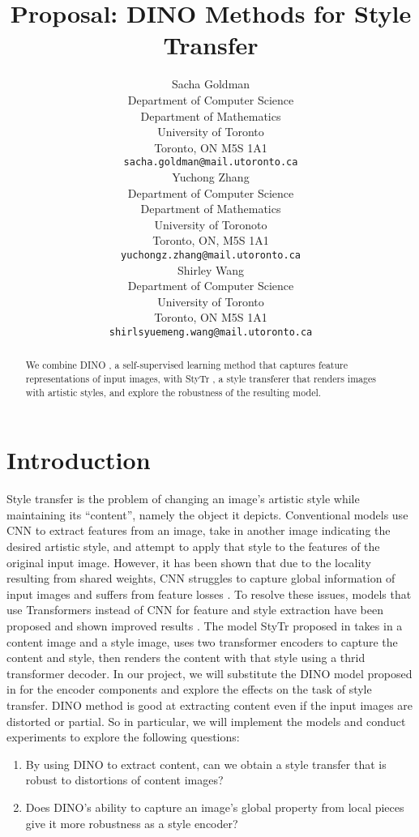 \documentclass{article}
\title{Proposal: DINO Methods for Style Transfer}
\author{
  Sacha Goldman \\
  Department of Computer Science\\ 
  Department of Mathematics\\
  University of Toronto\\
  Toronto, ON M5S 1A1 \\
  \texttt{sacha.goldman@mail.utoronto.ca} \\
  \And
  Yuchong Zhang \\
  Department of Computer Science \\
  Department of Mathematics \\
  University of Toronoto \\
  Toronto, ON, M5S 1A1 \\
  \texttt{yuchongz.zhang@mail.utoronto.ca} \\
  \And
  Shirley Wang \\
  Department of Computer Science \\
  University of Toronto \\
  Toronto, ON M5S 1A1 \\
  \texttt{shirlsyuemeng.wang@mail.utoronto.ca} \\
}
\begin{document}
\maketitle

\begin{abstract}
We combine DINO \cite{DINO}, a self-supervised learning method that captures feature representations of input images, with StyTr \cite{ImageStyleTransformer}, a style transferer that renders images with artistic styles, and explore the robustness of the resulting model.
\end{abstract}

\section{Introduction}
Style transfer is the problem of changing an image's artistic style while maintaining its ``content'', namely the object it depicts. Conventional models use CNN to extract features from an image, take in another image indicating the desired artistic style, and attempt to apply that style to the features of the original input image. However, it has been shown that due to the locality resulting from shared weights, CNN struggles to capture global information of input images and suffers from feature losses \cite{ImageStyleTransformer}. To resolve these issues, models that use Transformers instead of CNN for feature and style extraction have been proposed and shown improved results \cite{ImageStyleTransformer}. The model StyTr proposed in \cite{ImageStyleTransformer} takes in a content image and a style image, uses two transformer encoders to capture the content and style, then renders the content with that style using a thrid transformer decoder. In our project, we will substitute the DINO model proposed in \cite{DINO} for the encoder components and explore the effects on the task of style transfer. DINO method is good at extracting content even if the input images are distorted or partial. So in particular, we will implement the models and conduct experiments to explore the following questions:
\begin{enumerate}
  \item By using DINO to extract content, can we obtain a style transfer that is robust to distortions of content images?
  \item Does DINO's ability to capture an image's global property from local pieces give it more robustness as a style encoder?
\end{enumerate}
\end{document}
